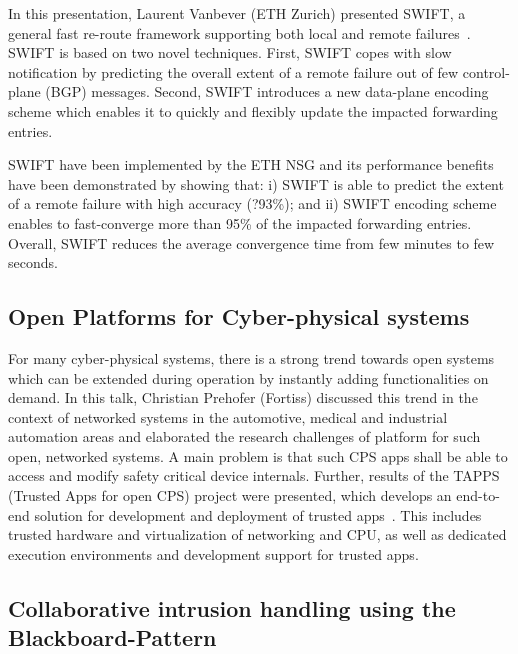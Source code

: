 In this presentation, Laurent Vanbever (ETH Zurich) presented SWIFT, a general
fast re-route framework supporting both local and remote failures~\cite{}.
SWIFT is based on two novel techniques. First, SWIFT copes with slow
notification by predicting the overall extent of a remote failure out of few
control-plane (BGP) messages. Second, SWIFT introduces a new data-plane
encoding scheme which enables it to quickly and flexibly update the impacted
forwarding entries.

SWIFT have been implemented by the ETH \ac{NSG} and its performance benefits
have been demonstrated by showing that: i) SWIFT is able to predict the extent
of a remote failure with high accuracy (?93\%); and ii) SWIFT encoding scheme
enables to fast-converge more than 95\% of the impacted forwarding entries.
Overall, SWIFT reduces the average convergence time from few minutes to few
seconds.


\subsection{Open Platforms for Cyber-physical systems}

For many cyber-physical systems, there is a strong trend towards open systems
which can be extended during operation by instantly adding functionalities on
demand. In this talk, Christian Prehofer (Fortiss) discussed this trend in the
context of networked systems in the automotive, medical and industrial
automation areas and elaborated the research challenges of platform for such
open, networked systems. A main problem is that such CPS apps shall be able to
access and modify safety critical device internals. Further, results of the
TAPPS (Trusted Apps for open CPS) project were presented, which  develops an
end-to-end solution for development and deployment of trusted
apps~\cite{prehofer:eitec:2016}. This includes trusted hardware and
virtualization of networking and CPU, as well as dedicated execution
environments and development support for trusted apps.


\subsection{Collaborative intrusion handling using the Blackboard-Pattern}

